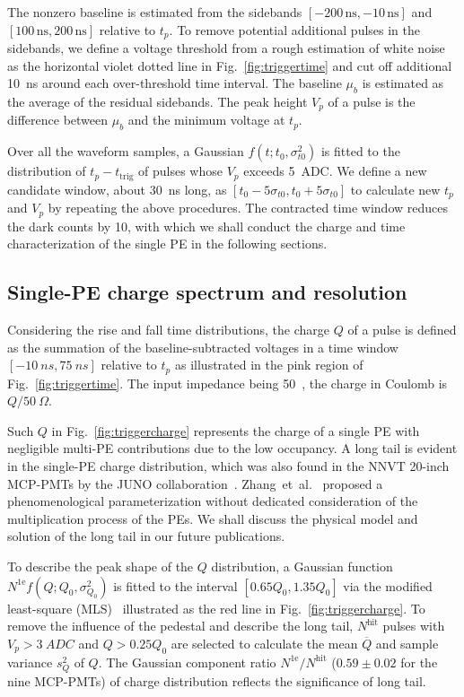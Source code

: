 The nonzero baseline is estimated from the sidebands $[-200\,\mathrm{ns},-10\,\mathrm{ns}]$ and $[100\,\mathrm{ns},200\,\mathrm{ns}]$ relative to $t_p$. %
To remove potential additional pulses in the sidebands, we define a voltage threshold from a rough estimation of white noise as the horizontal violet dotted line in Fig.~\ref{fig:triggertime} and cut off additional \SI{10}{ns} around each over-threshold time interval. The baseline $\mu_b$ is estimated as the average of the residual sidebands. The peak height $V_p$ of a pulse is the difference between $\mu_b$ and the minimum voltage at \(t_p\).

Over all the waveform samples, a Gaussian $f(t;t_0,\sigma_{t0}^2)$ is fitted to the distribution of $t_p-t_{\mathrm{trig}}$ of pulses whose $V_p$ exceeds \SI{5}{ADC}. We define a new candidate window, about \SI{30}{ns} long, as $[t_0-5\sigma_{t0}, t_0+5\sigma_{t0}]$ to calculate new $t_p$ and $V_p$ by repeating the above procedures.  The contracted time window reduces the dark counts by 10, with which we shall conduct the charge and time characterization of the single PE in the following sections.

\subsection{Single-PE charge spectrum and resolution}
\label{sec:noisepeak}

Considering the rise and fall time distributions, the charge $Q$ of a pulse is defined as %
the summation of the baseline-subtracted voltages in a time window $[\SI{-10}{ns}, \SI{75}{ns}]$ relative to $t_p$ as illustrated in the pink region of Fig.~\ref{fig:triggertime}. The input impedance being \SI{50}{\Omega}~\cite{CAENV1751}, the charge in Coulomb is $Q/\SI{50}{\Omega}$.

Such $Q$ in Fig.~\ref{fig:triggercharge} represents the charge of a single PE with negligible multi-PE contributions due to the low occupancy. A long tail is evident in the single-PE charge distribution, which was also found in the NNVT 20-inch MCP-PMTs by the JUNO collaboration~\cite{JUNOMassTesting}. Zhang~et~al.~\cite{JUNOLongtail} proposed a phenomenological parameterization without dedicated consideration of the multiplication process of the PEs. We shall discuss the physical model and solution of the long tail in our future publications.

To describe the peak shape of the $Q$ distribution, a Gaussian function $N^{\mathrm{1e}}f(Q;Q_0,\sigma^2_{Q_0})$ is fitted to the interval $[0.65Q_0, 1.35Q_0]$ via the modified least-square (MLS)~\cite{Cowan1998StatisticalDA} illustrated as the red line in Fig.~\ref{fig:triggercharge}. To remove the influence of the pedestal and describe the long tail, $N^{\mathrm{hit}}$ pulses with $V_p>\SI{3}{ADC}$ and $Q>0.25Q_0$ are selected to calculate the mean $\overline{Q}$ and sample variance $s^2_{Q}$ of $Q$. The Gaussian component ratio $N^{\mathrm{1e}}/N^{\mathrm{hit}}$ ($0.59\pm0.02$ for the nine MCP-PMTs) of charge distribution reflects the significance of long tail.

